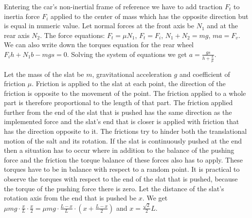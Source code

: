 \documentclass[11pt]{article}
\begin{document}

\solueng
Entering the car’s non-inertial frame of reference we have to add traction $F_t$ to inertia force $F_i$ applied to the center of mass which has the opposite direction but is equal in numeric value. Let normal forces at the front axis be $N_1$ and at the rear axis $N_2$. The force equations: $F_t=\mu N_1$, $F_t=F_i$, $N_1+N_2=mg$, $ma=F_v$. We can also write down the torques equation for the rear wheel $F_ih+N_1b-mgs=0$. Solving the system of equations we get $a=\frac{gs}{h+\frac{b}{\mu}}$.
\probend
\bigskip


\solueng
Let the mass of the slat be $m$, gravitational acceleration $g$ and coefficient of friction $\mu$. Friction is applied to the slat at each point, the direction of the friction is opposite to the movement of the point. The friction applied to a whole part is therefore proportional to the length of that part. The friction applied further from the end of the slat that is pushed has the same direction as the implemented force and the slat’s end that is closer is applied with friction that has the direction opposite to it. The frictions try to hinder both the translational motion of the salt and its rotation. If the slat is continuously pushed at the end then a situation has to occur where in addition to the balance of the pushing force and the friction the torque balance of these forces also has to apply. These torques have to be in balance with respect to a random point. It is practical to observe the torques with respect to the end of the slat that is pushed, because the torque of the pushing force there is zero. Let the distance of the slat’s rotation axis from the end that is pushed be $x$. We get $\mu mg \cdot \frac{x}{L} \cdot \frac{x}{2}=\mu mg \cdot \frac{L-x}{L} \cdot \left(x+\frac{L-x}{2}\right)$ and $x=\frac{\sqrt{2}}{2}L$.
\probend
\bigskip

\end{document}
